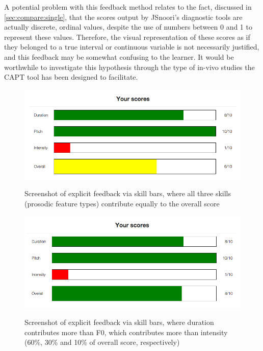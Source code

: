 		  A potential problem with this feedback method relates to the fact, discussed in \cref{sec:compare:single}, that the scores output by JSnoori's diagnostic tools are actually discrete, ordinal values, despite the use of numbers between 0 and 1 to represent these values. Therefore, the visual representation of these scores as if they belonged to a true interval or continuous variable is not necessarily justified, and this feedback may be somewhat confusing to the learner. It would be worthwhile to investigate this hypothesis through the type of in-vivo studies the CAPT tool has been designed to facilitate. 
		
		
			\begin{figure}
			\centering
			\caption[Skill bars as explicit feedback]{Screenshot of explicit feedback via skill bars, where all three skills (prosodic feature types) contribute equally to the overall score}
			\includegraphics[width=\textwidth]{img/screenshots/skillBars-balanced-of10}
			\label{fig:skillbars:balanced}
			\end{figure}		
			
			\begin{figure}
			\centering
			\caption[Skill bars with unequal skill weights]{Screenshot of explicit feedback via skill bars, where duration contributes more than F0, which contributes more than intensity (60\%, 30\% and 10\% of overall score, respectively) }
			\includegraphics[width=\textwidth]{img/screenshots/skillBars-durPriority}
			\label{fig:skillbars:durpriority}
			\end{figure}	
		
